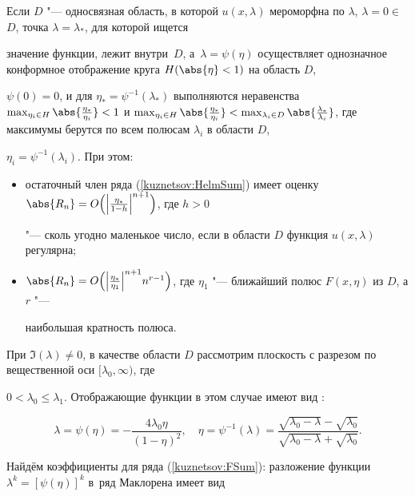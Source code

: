 Если $D$ "--- односвязная область,  в которой $u(x,  \lambda)$ мероморфна по $\lambda$,  \mbox{$\lambda=0 \in$} $ D$,  точка $\lambda=\lambda_*$,  для которой ищется

значение функции,  лежит внутри~$D$,  а~$\lambda=\psi(\eta)$ осуществляет однозначное конформное отображение круга \linebreak ${H (\abs{\eta}<1)}$ на область $D$,

$\psi(0)=0$,  и для $\eta_*=\psi^{-1}(\lambda_*)$ выполняются неравенства $\max_{\eta_i\in H}\abs{\frac{\eta_*}{\eta_i}}<1$ и $\max_{\eta_i\in

H}\abs{\frac{\eta_*}{\eta_i}}<\max_{\lambda_i\in D}\abs{\frac{\lambda_*}{\lambda_i}}$,  где максимумы берутся по всем полюсам $\lambda_i$ в области $D$,

${\eta_i=\psi^{-1}(\lambda_i)}$. При этом:

\begin{itemize}

    \item остаточный член ряда (\ref{kuznetsov:HelmSum}) имеет оценку $\abs{R_n}=O\Bigl(\Bigl|\frac{\eta_*}{1-h}\Bigr|^{n+1}\Bigr)$,  где ${h>0}$

"--- сколь угодно маленькое число,  если в области $D$ функция $u(x,  \lambda)$ регулярна;

    \item $\abs{R_n}=O\Bigl(\Bigl|\frac{\eta_*}{\eta_1} \Bigr|^{n+1}n^{r-1}\Bigr)$,  где $\eta_1$ "--- ближайший полюс $F(x,  \eta)$ из $D$,  а $r$ "---

наибольшая кратность полюса.

\end{itemize}



   При $\Im(\lambda)\neq0$,  в качестве области $D$ рассмотрим плоскость с разрезом по вещественной оси $[\lambda_0,  \infty)$,  где

$0<\lambda_0\leqslant\lambda_1$. Отображающие функции в этом случае имеют вид \cite{kuznetsov:Kublanovskaya}:

   $$

   \lambda=\psi(\eta)=-\frac{4\lambda_0\eta}{(1-\eta)^2}, \quad

        \eta=\psi^{-1}(\lambda)=\frac{\sqrt{\lambda_0-\lambda}-\sqrt{\lambda_0}}{\sqrt{\lambda_0-\lambda}+\sqrt{\lambda_0}}.

    $$



   Найдём коэффициенты для ряда (\ref{kuznetsov:FSum}): разложение функции $\lambda^k=[\psi(\eta)]^k$ в~ряд Маклорена имеет вид

